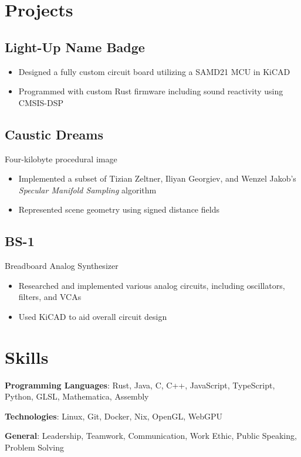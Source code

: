 \documentclass[letterpaper,10pt]{article}
\begin{document}
\section*{Projects}

\subsection*{Light-Up Name Badge}

\begin{itemize}[topsep=0.5em, partopsep=0em, itemsep=0.125em]
    \item Designed a fully custom circuit board utilizing a SAMD21 MCU in KiCAD
    \item Programmed with custom Rust firmware including sound reactivity using CMSIS-DSP
\end{itemize}

\subsection*{Caustic Dreams}
Four-kilobyte procedural image

\begin{itemize}[topsep=0.5em, partopsep=0em, itemsep=0.125em]
    \item Implemented a subset of Tizian Zeltner, Iliyan Georgiev, and Wenzel Jakob's \textit{Specular Manifold Sampling} algorithm
    \item Represented scene geometry using signed distance fields
\end{itemize}

\subsection*{BS-1}
Breadboard Analog Synthesizer

\begin{itemize}[topsep=0.5em, partopsep=0em, itemsep=0.125em]
    \item Researched and implemented various analog circuits, including oscillators, filters, and VCAs
    \item Used KiCAD to aid overall circuit design
\end{itemize}

\section*{Skills}

\textbf{Programming Languages}: Rust, Java, C, C++, JavaScript, TypeScript, Python, GLSL, Mathematica, Assembly

\medskip

\textbf{Technologies}: Linux, Git, Docker, Nix, OpenGL, WebGPU

\medskip

\textbf{General}: Leadership, Teamwork, Communication, Work Ethic, Public Speaking, Problem Solving
\end{document}
